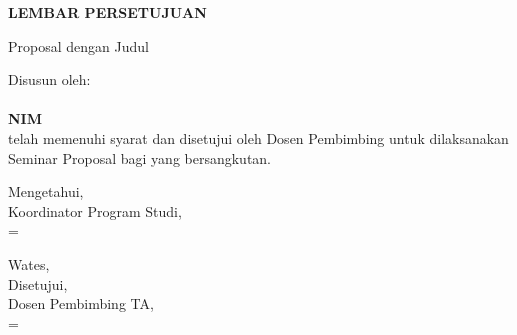 
\newpage
\logowatermark

\newcommand{\smartsignature}[2]{%
    \setbox0=\hbox{#1}%
    \ifdim\wd0>0.47\textwidth
        {\small #1\\[0.3em]#2}%
    \else
        {#1\\[0.3em]#2}%
    \fi
}

\begin{center}
    \begin{doublespace}
        \textbf{\large \MakeUppercase{lembar persetujuan}}
    \end{doublespace}
\end{center}

\begin{center}
    Proposal {\tipe} dengan Judul
\end{center}

\begin{center}
    \begin{doublespace}
        \textbf{\large \MakeUppercase {\judulid}}
    \end{doublespace}
\end{center}

\begin{center}
    Disusun oleh:\\
    \textbf{\penulis}\\
    \textbf{NIM \nim}\\[1.5cm]

    telah memenuhi syarat dan disetujui oleh Dosen Pembimbing untuk dilaksanakan Seminar Proposal {\tipe} bagi yang bersangkutan.\\[0.75cm]
\end{center}

\vspace{0.75cm}
\noindent\begin{minipage}[t]{0.47\textwidth}
    \centering
    \vspace{1.5em}
    Mengetahui,\\
    Koordinator Program Studi,\\[2.5cm]
    
    \smartsignature{\koorprodi}{NIP. \NIPkoorprodi}
\end{minipage}%
\hfill%
\begin{minipage}[t]{0.47\textwidth}
    \centering
    Wates, \tglpersetujuan\\[1em]
    Disetujui,\\
    Dosen Pembimbing TA,\\[2.5cm]
    
    \smartsignature{\pembimbing}{NIP. \NIPpembimbing}
\end{minipage}%
